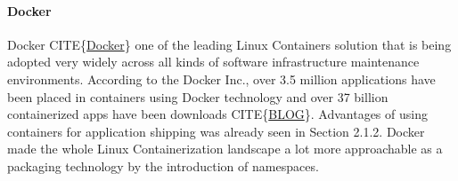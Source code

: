 \documentclass[12pt,titlepage]{article}
\begin{document}
\paragraph{Docker}
\label{sec:orgb3dae8e}
Docker CITE\{\href{https://www.docker.com/}{Docker}\} one of the leading Linux Containers solution that is being
adopted very widely across all kinds of software infrastructure maintenance
environments. According to the Docker Inc., over 3.5 million applications have
been placed in containers using Docker technology and over 37 billion
containerized apps have been downloads CITE\{\href{https://www.zdnet.com/article/what-is-docker-and-why-is-it-so-darn-popular/}{BLOG}\}. Advantages of using
containers for application shipping was already seen in Section 2.1.2. Docker
made the whole Linux Containerization landscape a lot more approachable as a
packaging technology by the introduction of namespaces.
\end{document}
